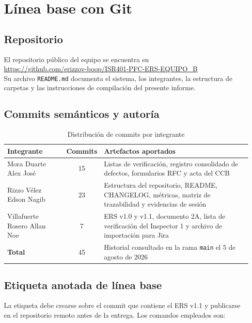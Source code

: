 \documentclass[11pt,letterpaper]{article}
\begin{document}
\section{Línea base con Git}

\subsection{Repositorio}

El repositorio público del equipo se encuentra en\\
\url{https://github.com/erizzov-boop/ISR401-PFC-ERS-EQUIPO_B}\\
 Su archivo \texttt{README.md} documenta el
sistema, los integrantes, la estructura de carpetas y las instrucciones de compilación del presente
informe.

\subsection{Commits semánticos y autoría}

\begin{table}[H]
\centering
\caption{Distribución de commits por integrante}
\begin{tabular}{L{5cm} c L{6.5cm}}
\toprule
\textbf{Integrante} & \textbf{Commits} & \textbf{Artefactos aportados}\\
\midrule
Mora Duarte Alex José & 15 & Listas de verificación, registro consolidado de defectos, formularios RFC y acta del CCB\\
Rizzo Vélez Edson Nagib & 23 & Estructura del repositorio, README, CHANGELOG, métricas, matriz de trazabilidad y evidencias de sesión\\
Villafuerte Rosero Allan Noe & 7 & ERS v1.0 y v1.1, documento 2A, lista de verificación del Inspector 1 y archivo de importación para Jira\\
\midrule
\textbf{Total} & 45 & Historial consultado en la rama \texttt{main} el 5 de agosto de 2026\\
\bottomrule
\end{tabular}
\end{table}

\subsection{Etiqueta anotada de línea base}

La etiqueta debe crearse sobre el commit que contiene el ERS v1.1 y publicarse en el repositorio remoto
antes de la entrega. Los comandos empleados son:
\end{document}
